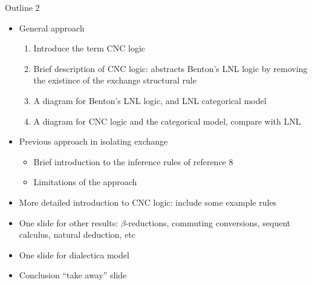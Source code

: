 \documentclass{beamer}
\begin{document}
\begin{frame}{Outline 2}
\begin{itemize}
\item General approach
      \begin{enumerate}
      \item Introduce the term CNC logic
      \item Brief description of CNC logic: abstracts Benton's LNL logic by
            removing the existince of the exchange structural rule
      \item A diagram for Benton's LNL logic, and LNL categorical model
      \item A diagram for CNC logic and the categorical model, compare with 
            LNL
      \end{enumerate}
\item Previous approach in isolating exchange
      \begin{itemize}
      \item Brief introduction to the inference rules of reference 8
      \item Limitations of the approach
      \end{itemize}
\item More detailed introduction to CNC logic: include some example rules
\item One slide for other results: $\beta$-reductions, commuting
      conversions, sequent calculus, natural deduction, etc
\item One slide for dialectica model
\item Conclusion ``take away'' slide
\end{itemize}
\end{frame}


\end{document}
